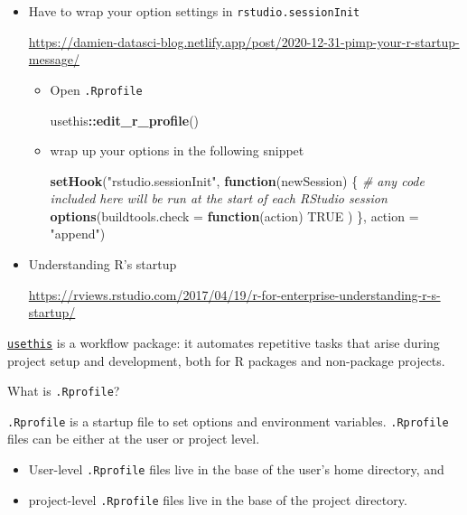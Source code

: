 \documentclass[
  a4paper,
  twoside,
  openright]{book}
\newenvironment{Shaded}{\begin{snugshade}}{\end{snugshade}}
\newcommand{\AttributeTok}[1]{\textcolor[rgb]{0.13,0.29,0.53}{#1}}
\newcommand{\CommentTok}[1]{\textcolor[rgb]{0.56,0.35,0.01}{\textit{#1}}}
\newcommand{\ConstantTok}[1]{\textcolor[rgb]{0.56,0.35,0.01}{#1}}
\newcommand{\ControlFlowTok}[1]{\textcolor[rgb]{0.13,0.29,0.53}{\textbf{#1}}}
\newcommand{\FunctionTok}[1]{\textcolor[rgb]{0.13,0.29,0.53}{\textbf{#1}}}
\newcommand{\NormalTok}[1]{#1}
\newcommand{\SpecialCharTok}[1]{\textcolor[rgb]{0.81,0.36,0.00}{\textbf{#1}}}
\newcommand{\StringTok}[1]{\textcolor[rgb]{0.31,0.60,0.02}{#1}}
\providecommand{\tightlist}{%
  \setlength{\itemsep}{0pt}\setlength{\parskip}{0pt}}
\theoremstyle{definition}
\theoremstyle{definition}
\theoremstyle{definition}
\theoremstyle{definition}
\theoremstyle{remark}
\begin{document}
\begin{itemize}
\item
  Have to {wrap your option settings in \texttt{rstudio.sessionInit}}

  \url{https://damien-datasci-blog.netlify.app/post/2020-12-31-pimp-your-r-startup-message/}

  \begin{itemize}
  \item
    Open \texttt{.Rprofile}

\begin{Shaded}
\begin{Highlighting}[]
\NormalTok{usethis}\SpecialCharTok{::}\FunctionTok{edit\_r\_profile}\NormalTok{()}
\end{Highlighting}
\end{Shaded}
  \item
    wrap up your options in the following snippet

\begin{Shaded}
\begin{Highlighting}[]
\FunctionTok{setHook}\NormalTok{(}\StringTok{"rstudio.sessionInit"}\NormalTok{, }\ControlFlowTok{function}\NormalTok{(newSession) \{}
  \CommentTok{\# any code included here will be run at the start of each RStudio session}
  \FunctionTok{options}\NormalTok{(}\AttributeTok{buildtools.check =} \ControlFlowTok{function}\NormalTok{(action) }\ConstantTok{TRUE}\NormalTok{ )}
\NormalTok{\}, }\AttributeTok{action =} \StringTok{"append"}\NormalTok{)}
\end{Highlighting}
\end{Shaded}
  \end{itemize}
\item
  Understanding R's startup

  \url{https://rviews.rstudio.com/2017/04/19/r-for-enterprise-understanding-r-s-startup/}
\end{itemize}

\href{https://usethis.r-lib.org/reference/index.html}{\texttt{usethis}} is a workflow package: it automates repetitive tasks that arise during project setup and development, both for R packages and non-package projects.

What is \texttt{.Rprofile}?

\texttt{.Rprofile} is a startup file to set options and environment variables. \texttt{.Rprofile} files can be either at the user or project level.

\begin{itemize}
\tightlist
\item
  User-level \texttt{.Rprofile} files live in the base of the user's {home directory}, and
\item
  project-level \texttt{.Rprofile} files live in the base of the project directory.
\end{itemize}
\end{document}
